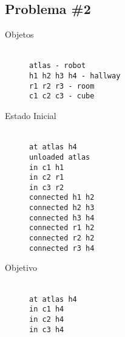 \documentclass[letterpaper]{article}
\begin{document}
\subsection{Problema \#2}
\begin{description}
  \item[Objetos]\hfill\\
    \texttt{atlas - robot\\h1 h2 h3 h4 - hallway\\r1 r2 r3 - room\\c1 c2 c3 - cube}
  \item[Estado Inicial]\hfill\\
    \texttt{at atlas h4\\unloaded atlas\\in c1 h1\\in c2 r1\\in c3 r2\\connected h1 h2\\connected h2 h3\\connected h3 h4\\connected r1 h2\\connected r2 h2\\connected r3 h4}
  \item[Objetivo]\hfill\\
    \texttt{at atlas h4\\in c1 h4\\in c2 h4\\in c3 h4}
\end{description}
\end{document}
